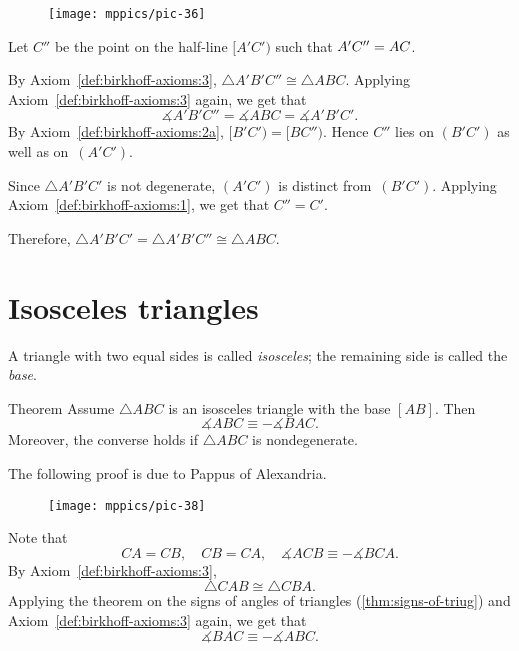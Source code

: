 \begin{wrapfigure}{o}{26mm}
\vskip-4mm
\centering
\texttt{[image: mppics/pic-36]}
\end{wrapfigure}

Let $C''$ be the point on the half-line $[A' C')$ such that $A' C''\z=A C$. 

By Axiom~\ref{def:birkhoff-axioms:3}, 
$\triangle A' B' C''\cong \triangle A B C$. 
Applying Axiom~\ref{def:birkhoff-axioms:3} again,
we get that
$$\measuredangle A' B' C'' = \measuredangle A B C=\measuredangle A' B' C'.$$
By Axiom~\ref{def:birkhoff-axioms:2a}, $[B'C')=[B C'')$. 
Hence
$C''$ lies on $(B' C')$ as well as on~$(A' C')$.

Since $\triangle A' B' C'$ is not degenerate, $(A' C')$ is distinct from~$(B' C')$.
Applying Axiom~\ref{def:birkhoff-axioms:1}, we get that $C''=C'$. 

Therefore, 
$\triangle A' B' C'=\triangle A' B' C''\cong\triangle A B C$.
\qeds

\section*{Isosceles triangles}

A triangle with two equal sides is called \emph{isosceles};
the remaining side is called the \emph{base}.


\begin{thm}[\abs]{Theorem}\label{thm:isos}
Assume $\triangle A B C$ is an isosceles triangle with the base $[A B]$. 
Then 
$$\measuredangle A B C\equiv -\measuredangle B A C.$$
Moreover, the converse holds if $\triangle A B C$ is nondegenerate.
\end{thm}

The following proof is due to Pappus of Alexandria.

\begin{wrapfigure}[10]{o}{25mm}
\vskip-4mm
\centering
\texttt{[image: mppics/pic-38]}
\end{wrapfigure}

Note that
$$C A = C B,
\quad 
C B=C A,
\quad
\measuredangle A C B \equiv -\measuredangle B C A.$$
By Axiom~\ref{def:birkhoff-axioms:3},
$$\triangle C A B\cong\triangle C B A.$$
Applying the theorem on the signs of angles of triangles (\ref{thm:signs-of-triug}) and Axiom~\ref{def:birkhoff-axioms:3} again,
we get that 
$$\measuredangle B A C
\equiv -\measuredangle A B C.$$

